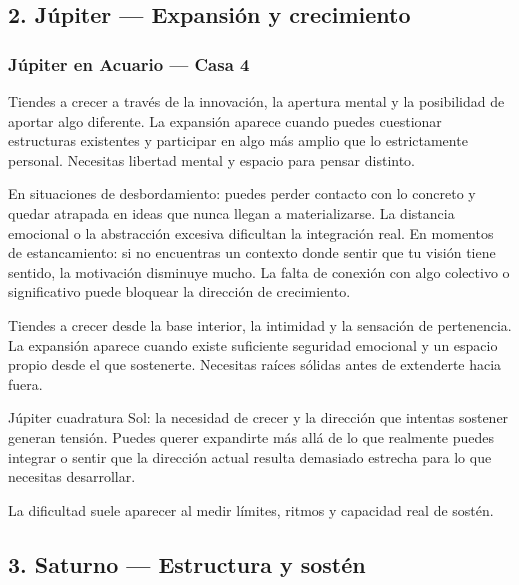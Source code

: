 \documentclass[11pt,a4paper]{article}
\begin{document}

\subsection{2. Júpiter — Expansión y crecimiento}

\subsubsection*{
Júpiter en Acuario
— Casa 4
}

Tiendes a crecer a través de la innovación, la apertura mental y la posibilidad de aportar algo diferente. La expansión aparece cuando puedes cuestionar estructuras existentes y participar en algo más amplio que lo estrictamente personal. Necesitas libertad mental y espacio para pensar distinto.

En situaciones de desbordamiento: puedes perder contacto con lo concreto y quedar atrapada en ideas que nunca llegan a materializarse. La distancia emocional o la abstracción excesiva dificultan la integración real. En momentos de estancamiento: si no encuentras un contexto donde sentir que tu visión tiene sentido, la motivación disminuye mucho. La falta de conexión con algo colectivo o significativo puede bloquear la dirección de crecimiento.

Tiendes a crecer desde la base interior, la intimidad y la sensación de pertenencia. La expansión aparece cuando existe suficiente seguridad emocional y un espacio propio desde el que sostenerte. Necesitas raíces sólidas antes de extenderte hacia fuera.

Júpiter cuadratura Sol: la necesidad de crecer y la dirección que intentas sostener generan tensión. Puedes querer expandirte más allá de lo que realmente puedes integrar o sentir que la dirección actual resulta demasiado estrecha para lo que necesitas desarrollar.

La dificultad suele aparecer al medir límites, ritmos y capacidad real de sostén.

\vspace{0.8cm}


\subsection{3. Saturno — Estructura y sostén}
\end{document}
